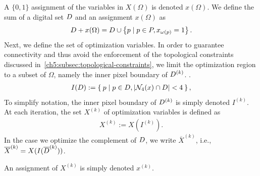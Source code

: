 A $\{0,1\}$ assignment of the variables in $X(\Omega)$ is denoted $x(\Omega)$. We define the sum of a digital set $D$ and an assignment $x(\Omega)$ as
\begin{align*}
	D + x(\Omega) = D \cup \left\{ p \; | \; p \in P, x_{\omega(p)}=1 \right\}.
\end{align*}
%
Next, we define the set of optimization variables. In order to guarantee connectivity and thus avoid the enforcement of the topological constraints discussed in~\cref{ch5:subsec:topological-constraints}, we limit the optimization region to a subset of $\Omega$, namely the inner pixel boundary of  $D^{(k)}$. .
\begin{align*}
	I(D) := \left\{ \: p \; | \; p \in D, |\mathcal{N}_4(x) \cap D|<4 \: \right\},
\end{align*}
%
%
To simplify notation, the inner pixel boundary of $D^{(k)}$ is simply denoted $I^{(k)}$. At each iteration, the set $X^{(k)}$ of optimization variables is defined as
\begin{align*}
	X^{(k)} := X(I^{(k)}).
\end{align*}
%
In the case we optimize the complement of $D$, we write $\overline{X}^{(k)}$, i.e., $\overline{X}^{(k)} = X(I(\overline{D}^ {(k)}))$.

An assignment of $X^{(k)}$ is simply denoted $x^{(k)}$. 


\subsection{}
\label{ch6:subsec:algorithm}

